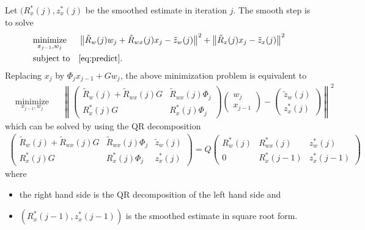 \documentclass[microtype]{gtpart}     %
\theoremstyle{definition}
\newcommand{\norm}[1]{\left\lVert#1\right\rVert}
\begin{document}
Let $(R^*_x(j), z^*_x(j)$ be the smoothed estimate in iteration $j$.
The smooth step is to solve
\begin{align*}
	& \underset{x_{j-1}, w_j}{\text{minimize}} & &\norm{\tilde{R}_w(j)w_j + \tilde{R}_{wx}(j)x_j - \tilde{z}_w(j)}^2 +
	\norm{\tilde{R}_x(j)x_j - \tilde{z}_x(j)}^2 \\
	& \text{subject to} & & \autoref{eq:predict}.
\end{align*}
Replacing $x_j$ by $\Phi_j x_{j-1} + Gw_j$, the above minimization problem is equivalent to
\begin{align*}
	& \underset{x_{j-1}, w_j}{\text{minimize}} & &\norm{
		\begin{pmatrix}
			\tilde{R}_w(j) + \tilde{R}_{wx}(j)G &\tilde{R}_{wx}(j)\Phi_j \\
			R^*_x(j)G &R^*_x(j)\Phi_j
		\end{pmatrix}
		\begin{pmatrix}
		w_j \\ x_{j-1}
		\end{pmatrix} - 
		\begin{pmatrix}
			\tilde{z}_w(j) \\ z^*_x(j)
		\end{pmatrix}}^2
\end{align*}
which can be solved by using the QR decomposition
\begin{align*}
	\begin{pmatrix}
		\tilde{R}_w(j) + \tilde{R}_{wx}(j)G &\tilde{R}_{wx}(j)\Phi_j &\tilde{z}_w(j) \\
		R^*_x(j)G &R^*_x(j)\Phi_j &z^*_x(j)
	\end{pmatrix} = Q
	\begin{pmatrix}
		R^*_w(j) &R^*_{wx}(j) &z^*_w(j) \\
		0 &R^*_x(j-1) &z^*_x(j-1)
	\end{pmatrix}
\end{align*}
where
\begin{itemize}
	\item the right hand side is the QR decomposition of the left hand side and
	\item $(R^*_x(j-1), z^*_x(j-1))$ is the smoothed estimate in square root form.
\end{itemize}


%
%
%


%


\end{document}

